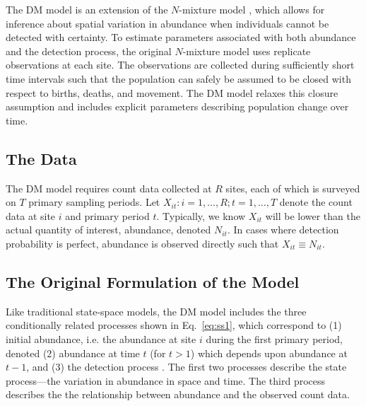 \documentclass[12pt]{article}
\begin{document}
The DM model is an extension of the $N$-mixture model
\citep{royle:2004biom}, which allows for inference about spatial
variation in abundance when individuals cannot be detected with
certainty. To estimate parameters associated with both abundance 
and the detection process, the original $N$-mixture model uses replicate
observations at each site. The observations are collected during sufficiently
short time intervals such that the population can safely be
assumed to be closed with respect to births, deaths, and movement. The DM
model relaxes this closure assumption and includes explicit parameters
describing population change over time.


\subsection{The Data}

The DM model requires count data collected at $R$ sites, each of
which is surveyed on $T$ primary sampling periods. 
Let $X_{it}: i=1,\hdots,R; t=1,\hdots,T$ denote the count data
at site $i$ and primary period $t$. 
Typically, we know $X_{it}$ will be lower than the
actual quantity of interest, abundance,
denoted $N_{it}$. In cases where detection probability is perfect,
abundance is observed directly such that $X_{it} \equiv N_{it}$.

\subsection{The Original Formulation of the Model}

Like traditional state-space models, the DM model includes the
three conditionally related processes shown in Eq.~\ref{eq:ss1},
which correspond to (1) initial abundance, i.e. the
abundance at site $i$ during the first primary period,
denoted (2) abundance at time $t$ (for $t>1$) which depends upon
abundance at $t-1$, and (3) the
detection process \citep{dail_madsen:2011}.
The first two processes describe the state process---the
variation in abundance in space and time. The third process %
describes the the relationship between
abundance and the observed count data.
\end{document}

